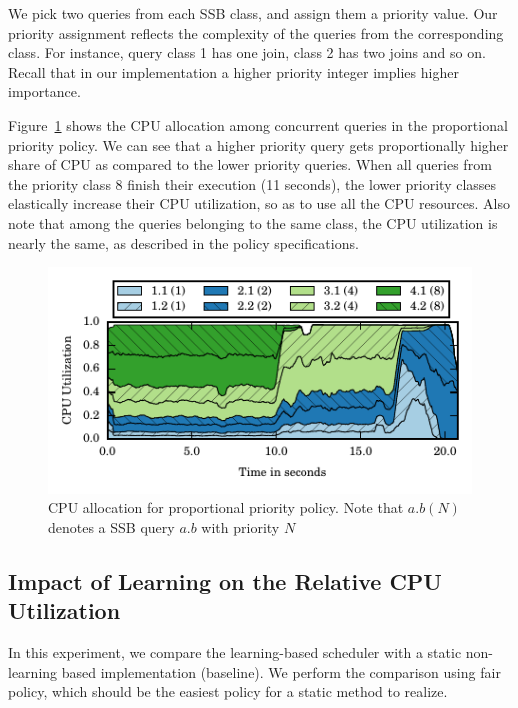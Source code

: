 We pick two queries from each SSB class, and assign them a priority value. 
Our priority assignment reflects the complexity of the queries from the corresponding class. 
For instance, query class 1 has one join, class 2 has two joins and so on.
Recall that in our implementation a higher priority integer implies higher importance.

Figure~\ref{fig:pp-cpu-util} shows the CPU allocation among concurrent queries in the proportional priority policy.
We can see that a higher priority query gets proportionally higher share of CPU as 
compared to the lower priority queries.
When all queries from the priority class 8 finish their execution (11 seconds), the 
lower priority classes elastically increase their CPU utilization, so as to use all the CPU 
resources. 
Also note that among the queries belonging to the same class, the CPU utilization is 
nearly the same, as described in the policy specifications.

\begin{figure}[t]
	\centering
	\includegraphics[width=\columnwidth]{policy/figures/ssb-priority-uniform-2queries-perclass-cpu-util.pdf}
	\vspace{-2.5em}
	\caption{CPU allocation for proportional priority policy. Note that $a.b  (N)$ denotes a SSB query $a.b$ with priority $N$}
	\label{fig:pp-cpu-util}
\end{figure}

\subsection{Impact of Learning on the Relative CPU Utilization}\label{ssec:learning-impact-cpu-util}
In this experiment, we compare the learning-based scheduler with a static non-learning based implementation (baseline).
We perform the comparison using fair policy, which should be the easiest policy for a static method to realize.

